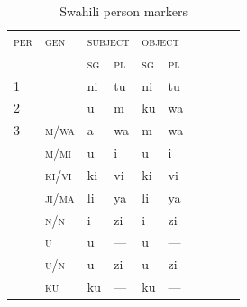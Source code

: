 \begin{table}[hbt]
  \centering
  \small
  \begin{tabular}{llllllllll}
    \toprule
    \textsc{per} & \textsc{gen} & \multicolumn{2}{l}{\textsc{subject}} &
                                                                         \multicolumn{2}{l}{\textsc{object}}\\%
                 & & \textsc{sg} & \textsc{pl} & \textsc{sg} & \textsc{pl}\\%
    \midrule
    1	&       & ni & tu  & ni & tu\\%
    2	&       & u	 & m   & ku & wa\\%
    3	& \textsc{m/wa}  & a	 & wa  & m  & wa\\%
                 & \textsc{m/mi}	& u  & i   & u  & i \\%
                 & \textsc{ki/vi}	& ki & vi  & ki & vi \\%
                 & \textsc{ji/ma} & li & ya  & li & ya \\%
                 & \textsc{n/n} & i    & zi  & i  & zi \\%
                 & \textsc{u}     & u  & --- & u  & --- \\%
                 & \textsc{u/n}   & u  & zi  & u  & zi  \\%
                 & \textsc{ku}    & ku & --- & ku & --- \\%
    \bottomrule
\end{tabular}
  \caption{Swahili person markers \citep{Stump93}} \label{ex:SwaPer} 

\end{table}

